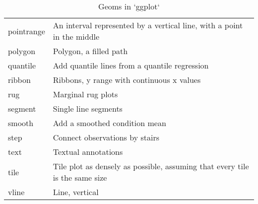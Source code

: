 \begin{table}
\begin{center}
\begin{tabular}{lp{3in}}
  pointrange   & An interval represented by a vertical line, with a point in the middle       \\
  polygon      & Polygon, a filled path                                                       \\
  quantile     & Add quantile lines from a quantile regression                                \\
  ribbon       & Ribbons, y range with continuous x values                                    \\
  rug          & Marginal rug plots                                                           \\
  segment      & Single line segments                                                         \\
  smooth       & Add a smoothed condition mean                                               \\
  step         & Connect observations by stairs                                               \\
  text         & Textual annotations                                                          \\
  tile         & Tile plot as densely as possible, assuming that every tile is the same size \\
  vline        & Line, vertical                                                               \\

  \bottomrule
  \end{tabular}
  \end{center}
  \caption{Geoms in `ggplot`}
  \label{tbl:geoms}
\end{table}

